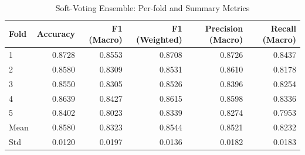 \begin{table}
\caption{Soft-Voting Ensemble: Per-fold and Summary Metrics}
\label{tab:ensemble_per_fold}
\begin{tabular}{lrrrrr}
\toprule
Fold & Accuracy & F1 (Macro) & F1 (Weighted) & Precision (Macro) & Recall (Macro) \\
\midrule
1 & 0.8728 & 0.8553 & 0.8708 & 0.8726 & 0.8437 \\
2 & 0.8580 & 0.8309 & 0.8531 & 0.8610 & 0.8178 \\
3 & 0.8550 & 0.8305 & 0.8526 & 0.8396 & 0.8254 \\
4 & 0.8639 & 0.8427 & 0.8615 & 0.8598 & 0.8336 \\
5 & 0.8402 & 0.8023 & 0.8339 & 0.8274 & 0.7953 \\
Mean & 0.8580 & 0.8323 & 0.8544 & 0.8521 & 0.8232 \\
Std & 0.0120 & 0.0197 & 0.0136 & 0.0182 & 0.0183 \\
\bottomrule
\end{tabular}
\end{table}
